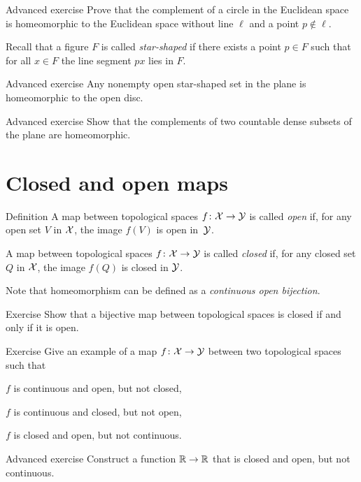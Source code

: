\begin{thm}{Advanced exercise}\label{ex:inversion}
Prove that the complement of a circle in the Euclidean space is homeomorphic to the Euclidean space without line $\ell$ and a point $p\not\in\ell$.
\end{thm}

Recall that a figure $F$ is called \emph{star-shaped} if there exists a point $p\in F$ such that for all $x\in F$ the line segment $px$ lies in $F$.

\begin{thm}{Advanced exercise}\label{ex:star-shaped}
Any nonempty open star-shaped set in the plane is homeomorphic to the open disc.
\end{thm}

\begin{thm}{Advanced exercise}\label{ex:cont-dense}
Show that the complements of two countable dense subsets of the plane are homeomorphic.
\end{thm}

\section{Closed and open maps}

\begin{thm}{Definition}\label{def:open-closed-maps}
A map between topological spaces 
$f\colon\mathcal{X}\to\mathcal{Y}$ is called \emph{open} if, for any open set $V$ in $\mathcal{X}$, the image $f(V)$ is open in~$\mathcal{Y}$.

A map between topological spaces 
$f\colon\mathcal{X}\to\mathcal{Y}$ is called \emph{closed} if, for any closed set $Q$ in $\mathcal{X}$, the image $f(Q)$ is closed in $\mathcal{Y}$.
\end{thm}

Note that homeomorphism can be defined as a \textit{continuous open bijection}.

\begin{thm}{Exercise}\label{ex:bijective-closed-open}
Show that a bijective map between topological spaces is closed if and only if it is open.
\end{thm}

\begin{thm}{Exercise}\label{ex:closed-open-cont}
Give an example of a map $f\colon\mathcal{X}\to\mathcal{Y}$ between two topological spaces such that 
\begin{subthm}{}
$f$ is continuous and open, but not closed,
\end{subthm}

\begin{subthm}{}
$f$ is continuous and closed, but not open,
\end{subthm}

\begin{subthm}{}
$f$ is closed and open, but not continuous.
\end{subthm}

\end{thm}

\begin{thm}{Advanced exercise}\label{ex:closed-open-cont-R}
Construct a function $\mathbb{R}\to\mathbb{R}$ that is closed and open, but not continuous.
\end{thm}


